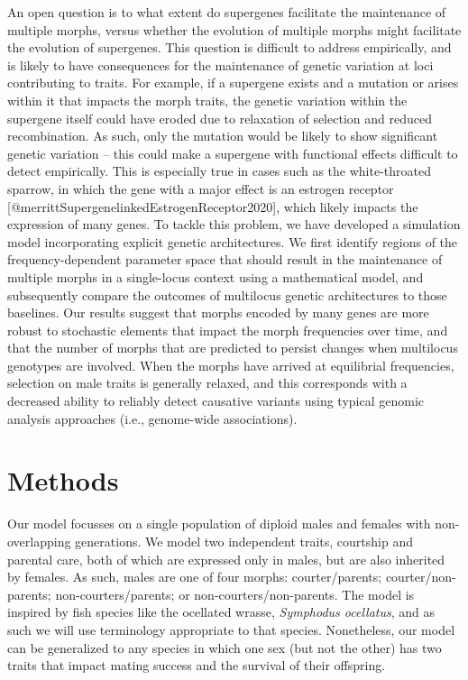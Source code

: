 \documentclass[
  11pt,
]{article}
\begin{document}
An open question is to what extent do supergenes facilitate the maintenance of multiple morphs, versus whether the evolution of multiple morphs might facilitate the evolution of supergenes.
This question is difficult to address empirically, and is likely to have consequences for the maintenance of genetic variation at loci contributing to traits. For example, if a supergene exists and a mutation or arises within it that impacts the morph traits, the genetic variation within the supergene itself could have eroded due to relaxation of selection and reduced recombination. As such, only the mutation would be likely to show significant genetic variation -- this could make a supergene with functional effects difficult to detect empirically. This is especially true in cases such as the white-throated sparrow, in which the gene with a major effect is an estrogen receptor {[}@merrittSupergenelinkedEstrogenReceptor2020{]}, which likely impacts the expression of many genes.
To tackle this problem, we have developed a simulation model incorporating explicit genetic architectures.
We first identify regions of the frequency-dependent parameter space that should result in the maintenance of multiple morphs in a single-locus context using a mathematical model, and subsequently compare the outcomes of multilocus genetic architectures to those baselines.
Our results suggest that morphs encoded by many genes are more robust to stochastic elements that impact the morph frequencies over time, and that the number of morphs that are predicted to persist changes when multilocus genotypes are involved.
When the morphs have arrived at equilibrial frequencies, selection on male traits is generally relaxed, and this corresponds with a decreased ability to reliably detect causative variants using typical genomic analysis approaches (i.e., genome-wide associations).

\hypertarget{methods}{%
\section{Methods}\label{methods}}

Our model focusses on a single population of diploid males and females
with non-overlapping generations. We model two independent traits,
courtship and parental care, both of which are expressed only in males,
but are also inherited by females. As such, males are one of four
morphs: courter/parents; courter/non-parents; non-courters/parents; or
non-courters/non-parents. The model is inspired by fish species like the
ocellated wrasse, \emph{Symphodus ocellatus}, and as such we will use
terminology appropriate to that species. Nonetheless, our model can be
generalized to any species in which one sex (but not the other) has two
traits that impact mating success and the survival of their offspring.
\end{document}
